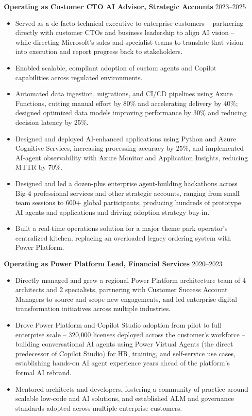 \documentclass[margin]{res}
\begin{document}
\begin{resume}
\textbf{Operating as Customer CTO AI Advisor, Strategic Accounts} \hfill 2023--2025\\
\begin{itemize}
\item Served as a de facto technical executive to enterprise customers -- partnering directly with customer CTOs and business leadership to align AI vision -- while directing Microsoft's sales and specialist teams to translate that vision into execution and report progress back to stakeholders.
\item Enabled scalable, compliant adoption of custom agents and Copilot capabilities across regulated environments.
\item Automated data ingestion, migrations, and CI/CD pipelines using Azure Functions, cutting manual effort by 80\% and accelerating delivery by 40\%; designed optimized data models improving performance by 30\% and reducing decision latency by 25\%.
\item Designed and deployed AI-enhanced applications using Python and Azure Cognitive Services, increasing processing accuracy by 25\%, and implemented AI-agent observability with Azure Monitor and Application Insights, reducing MTTR by 70\%.
\item Designed and led a dozen-plus enterprise agent-building hackathons across Big 4 professional services and other strategic accounts, ranging from small team sessions to 600+ global participants, producing hundreds of prototype AI agents and applications and driving adoption strategy buy-in.
\item Built a real-time operations solution for a major theme park operator's centralized kitchen, replacing an overloaded legacy ordering system with Power Platform.
\end{itemize}

\textbf{Operating as Power Platform Lead, Financial Services} \hfill 2020--2023\\
\begin{itemize}
\item Directly managed and grew a regional Power Platform architecture team of 4 architects and 2 specialists, partnering with Customer Success Account Managers to source and scope new engagements, and led enterprise digital transformation initiatives across multiple industries.
\item Drove Power Platform and Copilot Studio adoption from pilot to full enterprise scale -- 320,000 licenses deployed across the customer's workforce -- building conversational AI agents using Power Virtual Agents (the direct predecessor of Copilot Studio) for HR, training, and self-service use cases, establishing hands-on AI agent experience years ahead of the platform's formal AI rebrand.
\item Mentored architects and developers, fostering a community of practice around scalable low-code and AI solutions, and established ALM and governance standards adopted across multiple enterprise customers.
\end{itemize}


\end{resume}
\end{document}
